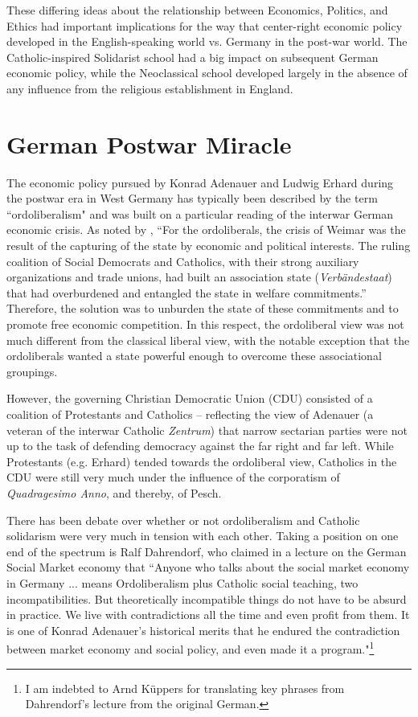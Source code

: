 \documentclass{article}
\begin{document}
These differing ideas about the relationship between Economics, Politics, and Ethics had important implications for the way that center-right economic policy developed in the English-speaking world vs. Germany in the post-war world.  The Catholic-inspired Solidarist school had a big impact on subsequent German economic policy, while the Neoclassical school developed largely in the absence of any influence from the religious establishment in England.

\section{German Postwar Miracle}

The economic policy pursued by Konrad Adenauer and Ludwig Erhard during the postwar era in West Germany has typically been described by the term ``ordoliberalism" and was built on a particular reading of the interwar German economic crisis.  As noted by \citet[p. 351]{hien2013}, “For the ordoliberals, the crisis of Weimar was the result of the capturing of the state by economic and political interests.  The ruling coalition of Social Democrats and Catholics, with their strong auxiliary organizations and trade unions, had built an association state (\emph{Verb\"{a}ndestaat}) that had overburdened and entangled the state in welfare commitments.”  Therefore, the solution was to unburden the state of these commitments and to promote free economic competition.  In this respect, the ordoliberal view was not much different from the classical liberal view, with the notable exception that the ordoliberals wanted a state powerful enough to overcome these associational groupings.\medskip

However, the governing Christian Democratic Union (CDU) consisted of a coalition of Protestants and Catholics – reflecting the view of Adenauer (a veteran of the interwar Catholic \emph{Zentrum}) that narrow sectarian parties were not up to the task of defending democracy against the far right and far left.  While Protestants (e.g. Erhard) tended towards the ordoliberal view, Catholics in the CDU were still very much under the influence of the corporatism of \emph{Quadragesimo Anno}, and thereby, of Pesch.\medskip

There has been debate over whether or not ordoliberalism and Catholic solidarism were very much in tension with each other.  Taking a position on one end of the spectrum is Ralf Dahrendorf, who claimed in a lecture on the German Social Market economy that ``Anyone who talks about the social market economy in Germany ... means Ordoliberalism plus Catholic social teaching, two incompatibilities. But theoretically incompatible things do not have to be absurd in practice. We live with contradictions all the time and even profit from them. It is one of Konrad Adenauer's historical merits that he endured the contradiction between market economy and social policy, and even made it a program."\footnote{I am indebted to Arnd K\"{u}ppers for translating key phrases from Dahrendorf's lecture from the original German.}\citep{dahrendorf2004} \medskip
\end{document}
